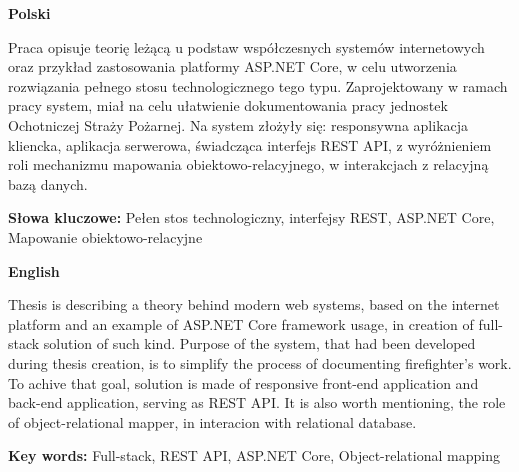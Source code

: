 \begin{flushleft}
    \textbf{Polski}
\end{flushleft}

Praca opisuje teorię leżącą u podstaw współczesnych systemów internetowych oraz przykład zastosowania platformy ASP.NET Core, w celu utworzenia rozwiązania pełnego stosu technologicznego tego typu. Zaprojektowany w ramach pracy system, miał na celu ułatwienie dokumentowania pracy jednostek Ochotniczej Straży Pożarnej. Na system złożyły się: responsywna aplikacja kliencka, aplikacja serwerowa, świadcząca interfejs REST API, z wyróżnieniem roli mechanizmu mapowania obiektowo-relacyjnego, w interakcjach z  relacyjną bazą danych.
\newline

\noindent\textbf{Słowa kluczowe:} Pełen stos technologiczny, interfejsy REST, ASP.NET Core, Mapowanie obiektowo-relacyjne

\begin{flushleft}
    \textbf{English}
\end{flushleft}

Thesis is describing a theory behind modern web systems, based on the internet platform and an example of ASP.NET Core framework usage, in creation of full-stack solution of such kind. Purpose of the system, that had been developed during thesis creation, is to simplify the process of documenting firefighter's work. To achive that goal, solution is made of responsive front-end application and back-end application, serving as REST API. It is also worth mentioning, the role of object-relational mapper, in interacion with relational database.
\newline

\noindent\textbf{Key words:} Full-stack, REST API, ASP.NET Core, Object-relational mapping